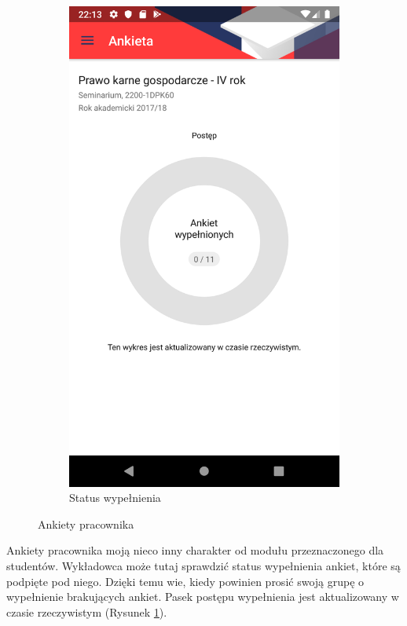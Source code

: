 \documentclass{pracamgr}
\begin{document}
\begin{figure}[p]
	\quad
	\begin{subfigure}[t]{0.3\textwidth}
		\includegraphics[width=\textwidth]{img/empsurveys_progress.png}
		\caption{Status wypełnienia}
		\label{fig:empsurveys_progress}
	\end{subfigure}
	\caption{Ankiety pracownika}\label{fig:empsurveys}
	\medskip
\end{figure}

Ankiety pracownika moją nieco inny charakter od modułu przeznaczonego dla studentów.
Wykładowca może tutaj sprawdzić status wypełnienia ankiet, które są podpięte pod
niego. Dzięki temu wie, kiedy powinien prosić swoją grupę o wypełnienie brakujących
ankiet. Pasek postępu wypełnienia jest aktualizowany w czasie rzeczywistym (Rysunek \ref{fig:empsurveys_progress}).
\end{document}
